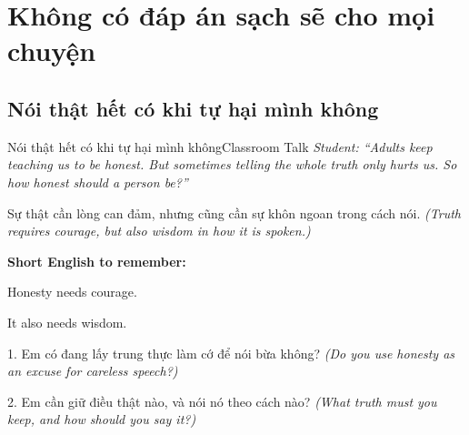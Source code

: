 \chapter{Không có đáp án sạch sẽ cho mọi chuyện}

\section{Nói thật hết có khi tự hại mình không}
\begin{truyen}{Nói thật hết có khi tự hại mình không}{Classroom Talk}
\textit{Student: ``Adults keep teaching us to be honest. But sometimes telling the whole truth only hurts us. So how honest should a person be?''}\\[4pt]



\end{truyen}

\begin{baihoc}
Sự thật cần lòng can đảm, nhưng cũng cần sự khôn ngoan trong cách nói.
\textit{(Truth requires courage, but also wisdom in how it is spoken.)}
\end{baihoc}

\begin{ghinhoanh}
\textbf{Short English to remember:}

Honesty needs courage.

It also needs wisdom.
\end{ghinhoanh}

\begin{tuhocnhanh}
1. Em có đang lấy trung thực làm cớ để nói bừa không? \textit{(Do you use honesty as an excuse for careless speech?)}

2. Em cần giữ điều thật nào, và nói nó theo cách nào? \textit{(What truth must you keep, and how should you say it?)}
\end{tuhocnhanh}
\ngancach

